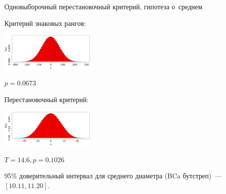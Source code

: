 \documentclass[9pt,pdf,utf8,hyperref={unicode},aspectratio=169]{beamer}
\begin{document}
\begin{frame}[label=perm1s]{\hyperlink{classification}{} Одновыборочный перестановочный критерий, гипотеза о~среднем}
{	Критерий знаковых рангов: 
	\begin{center}
		\includegraphics[width=0.35\textwidth]{ranksum24.png}    
	\end{center}	
	\vspace{-10pt}    
	$p=0.0673$
	
	\bigskip
	
	Перестановочный критерий: 
	\begin{center}
		\includegraphics[width=0.35\textwidth]{perm_wash.png}    
	\end{center}	
	\vspace{-10pt}       
	$T=14.6, p=0.1026$
	     
     95\% доверительный интервал для среднего диаметра (BCa бутстреп)~--- $\left[10.11, 11.20\right]$.  
 }
\end{frame}
\end{document}
